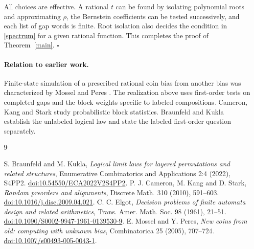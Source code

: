 \documentclass[11pt]{article}
\begin{document}
All choices are effective. A rational $t$ can be found by isolating polynomial roots and approximating $\rho$, the Bernstein coefficients can be tested successively, and each list of gap words is finite. Root isolation also decides the condition in \eqref{spectrum} for a given rational function. This completes the proof of Theorem~\ref{main}. \hfill$\square$

\paragraph{Relation to earlier work.}
Finite-state simulation of a prescribed rational coin bias from another bias was characterized by Mossel and Peres \cite{mp}. The realization above uses first-order tests on completed gaps and the block weights specific to labeled compositions. Cameron, Kang and Stark \cite{cks} study probabilistic block statistics. Braunfeld and Kukla \cite{bk} establish the unlabeled logical law and state the labeled first-order question separately.

\begin{thebibliography}{9}\raggedright
{} S. Braunfeld and M. Kukla, \emph{Logical limit laws for layered permutations and related structures}, Enumerative Combinatorics and Applications 2:4 (2022), S4PP2. \href{https://doi.org/10.54550/ECA2022V2S4PP2}{doi:10.54550/ECA2022V2S4PP2}.
 P. J. Cameron, M. Kang and D. Stark, \emph{Random preorders and alignments}, Discrete Math. 310 (2010), 591--603. \href{https://doi.org/10.1016/j.disc.2009.04.021}{doi:10.1016/j.disc.2009.04.021}.
 C. C. Elgot, \emph{Decision problems of finite automata design and related arithmetics}, Trans. Amer. Math. Soc. 98 (1961), 21--51. \href{https://doi.org/10.1090/S0002-9947-1961-0139530-9}{doi:10.1090/S0002-9947-1961-0139530-9}.
 E. Mossel and Y. Peres, \emph{New coins from old: computing with unknown bias}, Combinatorica 25 (2005), 707--724. \href{https://doi.org/10.1007/s00493-005-0043-1}{doi:10.1007/s00493-005-0043-1}.
\end{thebibliography}
\end{document}
